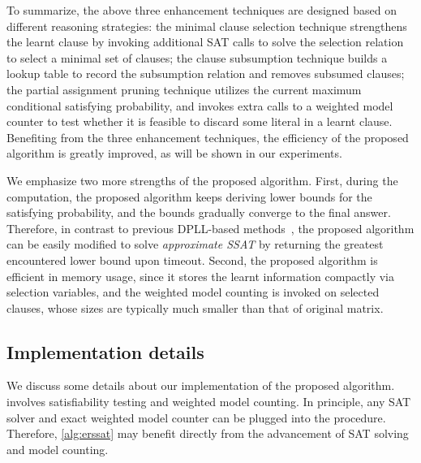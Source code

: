To summarize, the above three enhancement techniques are designed based on different reasoning strategies:
the minimal clause selection technique strengthens the learnt clause by invoking additional SAT calls to solve the selection relation to select a minimal set of clauses;
the clause subsumption technique builds a lookup table to record the subsumption relation and removes subsumed clauses;
the partial assignment pruning technique utilizes the current maximum conditional satisfying probability,
and invokes extra calls to a weighted model counter to test whether it is feasible to discard some literal in a learnt clause.
Benefiting from the three enhancement techniques,
the efficiency of the proposed algorithm is greatly improved,
as will be shown in our experiments.

We emphasize two more strengths of the proposed algorithm.
First, during the computation,
the proposed algorithm keeps deriving lower bounds for the satisfying probability,
and the bounds gradually converge to the final answer.
Therefore, in contrast to previous DPLL-based methods~\cite{Majercik1998,Majercik2003,Majercik2005},
the proposed algorithm can be easily modified to solve \textit{approximate SSAT} by returning the greatest encountered lower bound upon timeout.
Second, the proposed algorithm is efficient in memory usage,
since it stores the learnt information compactly via selection variables,
and the weighted model counting is invoked on selected clauses,
whose sizes are typically much smaller than that of original matrix.


\subsection{Implementation details}
We discuss some details about our implementation of the proposed algorithm.
 involves satisfiability testing and weighted model counting.
In principle, any SAT solver and exact weighted model counter can be plugged into the procedure.
Therefore, \cref{alg:erssat} may benefit directly from the advancement of SAT solving and model counting.

